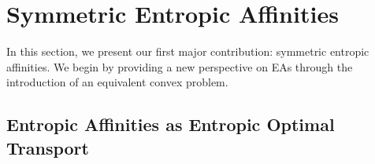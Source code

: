 

\section{Symmetric Entropic Affinities}\label{sec:sym_entropic_affinity}

In this section, we present our first major contribution: symmetric entropic affinities. We begin by providing a new perspective on EAs through the introduction of an equivalent convex problem.

\subsection{Entropic Affinities as Entropic Optimal Transport}\label{sec:entropic_affinity_semi_relaxed}

